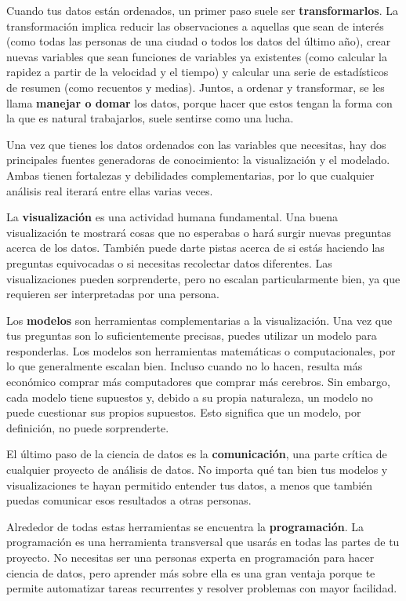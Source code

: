 \documentclass[11pt,oneside]{report}
\begin{document}
Cuando tus datos están ordenados, un primer paso suele ser
\textbf{transformarlos}. La transformación implica reducir las
observaciones a aquellas que sean de interés (como todas las personas de
una ciudad o todos los datos del último año), crear nuevas variables que
sean funciones de variables ya existentes (como calcular la rapidez a
partir de la velocidad y el tiempo) y calcular una serie de estadísticos
de resumen (como recuentos y medias). Juntos, a ordenar y transformar,
se les llama \textbf{manejar o domar} los datos, porque hacer que estos
tengan la forma con la que es natural trabajarlos, suele sentirse como
una lucha.

Una vez que tienes los datos ordenados con las variables que necesitas,
hay dos principales fuentes generadoras de conocimiento: la
visualización y el modelado. Ambas tienen fortalezas y debilidades
complementarias, por lo que cualquier análisis real iterará entre ellas
varias veces.

La \textbf{visualización} es una actividad humana fundamental. Una buena
visualización te mostrará cosas que no esperabas o hará surgir nuevas
preguntas acerca de los datos. También puede darte pistas acerca de si
estás haciendo las preguntas equivocadas o si necesitas recolectar datos
diferentes. Las visualizaciones pueden sorprenderte, pero no escalan
particularmente bien, ya que requieren ser interpretadas por una
persona.

Los \textbf{modelos} son herramientas complementarias a la
visualización. Una vez que tus preguntas son lo suficientemente
precisas, puedes utilizar un modelo para responderlas. Los modelos son
herramientas matemáticas o computacionales, por lo que generalmente
escalan bien. Incluso cuando no lo hacen, resulta más económico comprar
más computadores que comprar más cerebros. Sin embargo, cada modelo
tiene supuestos y, debido a su propia naturaleza, un modelo no puede
cuestionar sus propios supuestos. Esto significa que un modelo, por
definición, no puede sorprenderte.

El último paso de la ciencia de datos es la \textbf{comunicación}, una
parte crítica de cualquier proyecto de análisis de datos. No importa qué
tan bien tus modelos y visualizaciones te hayan permitido entender tus
datos, a menos que también puedas comunicar esos resultados a otras
personas.

Alrededor de todas estas herramientas se encuentra la
\textbf{programación}. La programación es una herramienta transversal
que usarás en todas las partes de tu proyecto. No necesitas ser una
personas experta en programación para hacer ciencia de datos, pero
aprender más sobre ella es una gran ventaja porque te permite
automatizar tareas recurrentes y resolver problemas con mayor facilidad.
\end{document}
